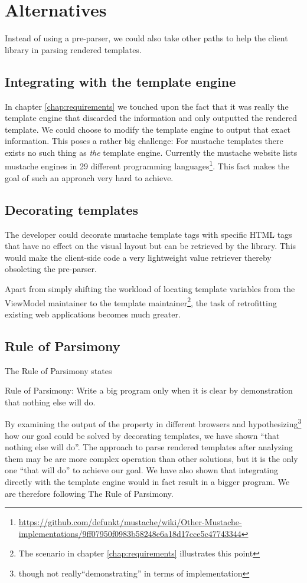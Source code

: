 \documentclass[thesis.tex]{subfiles}
\begin{document}
\section{Alternatives}

Instead of using a pre-parser, we could also take other paths to help
the client library in parsing rendered templates.

\subsection{Integrating with the template engine}

In chapter \ref{chap:requirements} we touched upon the fact that it was really
the template engine that discarded the information and only outputted the
rendered template. We could choose to modify the template engine to output that
exact information. This poses a rather big challenge:
For mustache templates there exists no such thing as \emph{the} template engine.
Currently the mustache website lists mustache engines in 29 different
programming languages\footnote{
      \url{https://github.com/defunkt/mustache/wiki/Other-Mustache-implementations/9ff07950f0983b58248e6a18d17cce5c47743344}
}.
This fact makes the goal of such an approach very hard to achieve.

\subsection{Decorating templates}

The developer could decorate mustache template tags with specific HTML tags that
have no effect on the visual layout but can be retrieved by the library.
This would make the client-side code a very lightweight value retriever
thereby obsoleting the pre-parser.

Apart from simply shifting the workload of locating template variables
from the ViewModel maintainer to the template maintainer\footnote{The scenario
in chapter \ref{chap:requirements} illustrates this point},
the task of retrofitting existing web applications becomes much greater.

\subsection{Rule of Parsimony}

The Rule of Parsimony states
\begin{citequote}{\cite[Chapter 1]{UXART}}
Rule of Parsimony: Write a big program only when it is clear by demonstration
that nothing else will do.
\end{citequote}

By examining the output of the  property in different browsers
and hypothesizing\footnote{though not really``demonstrating'' in terms of
implementation} how our goal could be solved by decorating templates,
we have shown ``that nothing else will do''.
The approach to parse rendered templates after analyzing them may be are
more complex operation than other solutions, but it is the only one
``that will do'' to achieve our goal. We have also shown that integrating
directly with the template engine would in fact result in a bigger program.
We are therefore following The Rule of Parsimony.
\end{document}
